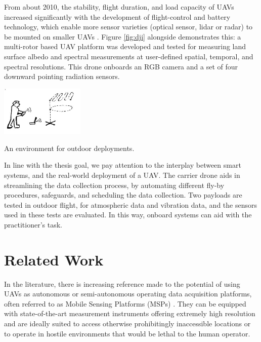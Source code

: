 From about 2010, the stability, flight duration, and load capacity of UAVs increased significantly with the development of flight-control and battery technology, which enable more sensor varieties (optical sensor, lidar or radar) to be mounted on smaller UAVs \cite{uav_components}. Figure \ref{fig:dji} alongside demonstrates this: a multi-rotor based UAV platform was developed and tested for measuring land surface albedo and spectral measurements at user-defined spatial, temporal, and spectral resolutions. This drone onboards an RGB camera and a set of four downward pointing radiation sensors.


\begin{marginfigure}%
  \vspace{0.3cm}
  \includegraphics[width=4cm]{images/intro/outputonlinejpgtools.jpg}
  \caption{An environment for outdoor deployments.}
  \label{fig:outdoors}
\end{marginfigure}

In line with the thesis goal, we pay attention to the interplay between smart systems, and the real-world deployment of a UAV. The carrier drone aids in streamlining the data collection process, by automating different fly-by procedures, safeguards, and scheduling the data collection. Two payloads are tested in outdoor flight, for atmospheric data and vibration data, and the sensors used in these tests are evaluated. In this way, onboard systems can aid with the practitioner’s task.




\pagebreak

\section{Related Work}

In the literature, there is increasing reference made to the potential of using UAVs as autonomous or semi-autonomous operating data acquisition platforms, often referred to as Mobile Sensing Platforms (MSPs) \cite{sørensen_jacobsen_hansen_2017} \cite{metrology_survey}. They can be equipped with state-of-the-art measurement instruments offering extremely high resolution and are ideally suited to 
access otherwise prohibitingly inaccessible locations or to operate in hostile environments that would be lethal to the human operator.

